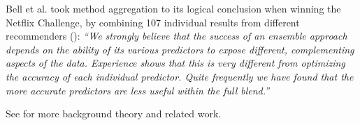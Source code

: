 Bell et al. took method aggregation to its logical conclusion when winning the Netflix Challenge,
by combining 107 individual results from different recommenders (\cite[p6]{Bell2007}):
  \emph{``We strongly believe that the success of an ensemble approach depends on the ability of its various predictors to expose different, 
  complementing aspects of the data. Experience shows that this is very different from optimizing the accuracy of each individual predictor. 
  Quite frequently we have found that the more accurate predictors are less useful within the full blend.''}

See \cite{Bjorkoy2011} for more background theory and related work.
